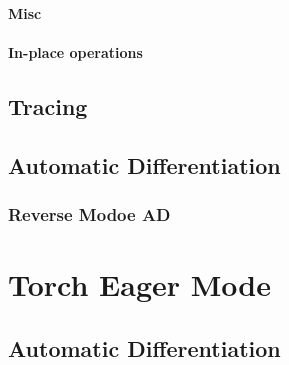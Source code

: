         \paragraph{Misc}
          
        \paragraph{In-place operations }



\newpage
  \subsection{Tracing}
  
  \subsection*{Automatic Differentiation}\label{subsec:automatic_differentiation}
    
    \subsubsection{Reverse Modoe AD}\label{subsubsec:reverse_modoe_ad}
      


  \section*{Torch Eager Mode}\label{subsec:torch_eager_mode}
      
    \subsection*{Automatic Differentiation }\label{subsec:automatic_differentiation}
      
      \label{subsubsec:gradient_computation}
          
